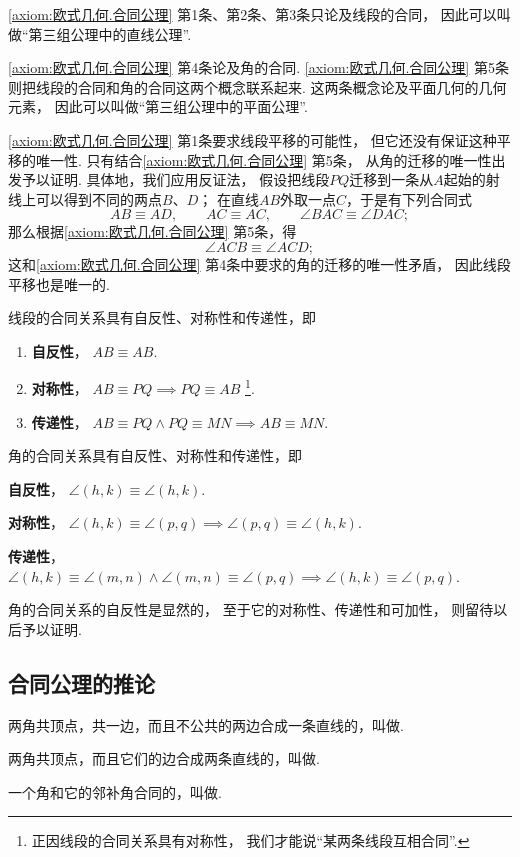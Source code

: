 \cref{axiom:欧式几何.合同公理} 第1条、第2条、第3条只论及线段的合同，%
因此可以叫做“第三组公理中的直线公理”.

\cref{axiom:欧式几何.合同公理} 第4条论及角的合同.
\cref{axiom:欧式几何.合同公理} 第5条则把线段的合同和角的合同这两个概念联系起来.
这两条概念论及平面几何的几何元素，%
因此可以叫做“第三组公理中的平面公理”.

\cref{axiom:欧式几何.合同公理} 第1条要求线段平移的可能性，%
但它还没有保证这种平移的唯一性.
只有结合\cref{axiom:欧式几何.合同公理} 第5条，%
从角的迁移的唯一性出发予以证明.
具体地，我们应用反证法，%
假设把线段\(PQ\)迁移到一条从\(A\)起始的射线上可以得到不同的两点\(B\)、\(D\)；
在直线\(AB\)外取一点\(C\)，于是有下列合同式
\[
AB \equiv AD, \qquad
AC \equiv AC, \qquad
\angle BAC \equiv \angle DAC;
\]
那么根据\cref{axiom:欧式几何.合同公理} 第5条，得
\[
\angle ACB \equiv \angle ACD;
\]
这和\cref{axiom:欧式几何.合同公理} 第4条中要求的角的迁移的唯一性矛盾，%
因此线段平移也是唯一的.

\begin{property}
线段的合同关系具有自反性、对称性和传递性，即
\begin{enumerate}
\item {\bf 自反性}，
\(AB \equiv AB\).

\item {\bf 对称性}，
\(AB \equiv PQ \implies PQ \equiv AB\)
\footnote{%
正因线段的合同关系具有对称性，
我们才能说“某两条线段互相合同”.
}.

\item {\bf 传递性}，
\(AB \equiv PQ \land PQ \equiv MN \implies AB \equiv MN\).
\end{enumerate}
\end{property}

\begin{property}
角的合同关系具有自反性、对称性和传递性，即
\item {\bf 自反性}，
\(\angle(h,k) \equiv \angle(h,k)\).

\item {\bf 对称性}，
\(\angle(h,k) \equiv \angle(p,q)
\implies
\angle(p,q) \equiv \angle(h,k)\).

\item {\bf 传递性}，
\(\angle(h,k) \equiv \angle(m,n)
\land
\angle(m,n) \equiv \angle(p,q)
\implies
\angle(h,k) \equiv \angle(p,q)\).
\end{property}
角的合同关系的自反性是显然的，%
至于它的对称性、传递性和可加性，%
则留待以后予以证明.

\subsection{合同公理的推论}
\begin{definition}
两角共顶点，共一边，而且不公共的两边合成一条直线的，叫做.
\end{definition}
\begin{definition}
两角共顶点，而且它们的边合成两条直线的，叫做.
\end{definition}
\begin{definition}
一个角和它的邻补角合同的，叫做.
\end{definition}

